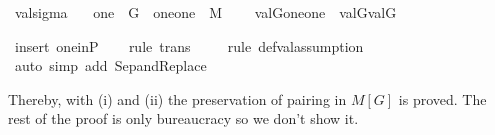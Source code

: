 \begin{isabelle}
\isamarkupfalse%
\ valsigma\ {\isacharcolon}\isanewline
\ \ {\isachardoublequoteopen}one\ {\isasymin}\ G\ {\isasymLongrightarrow}\ {\isacharbraceleft}{\isasymlangle}{\isasymtau}{\isacharcomma}one{\isasymrangle}{\isacharcomma}{\isasymlangle}{\isasymrho}{\isacharcomma}one{\isasymrangle}{\isacharbraceright}\ {\isasymin}\ M\ {\isasymLongrightarrow}\isanewline
\ \ \ val{\isacharparenleft}G{\isacharcomma}{\isacharbraceleft}{\isasymlangle}{\isasymtau}{\isacharcomma}one{\isasymrangle}{\isacharcomma}{\isasymlangle}{\isasymrho}{\isacharcomma}one{\isasymrangle}{\isacharbraceright}{\isacharparenright}\ {\isacharequal}\ {\isacharbraceleft}val{\isacharparenleft}G{\isacharcomma}{\isasymtau}{\isacharparenright}{\isacharcomma}val{\isacharparenleft}G{\isacharcomma}{\isasymrho}{\isacharparenright}{\isacharbraceright}{\isachardoublequoteclose}

\isamarkupfalse%
\ {\isacharparenleft}insert\ one{\isacharunderscore}in{\isacharunderscore}P{\isacharparenright}\isanewline
\ \ \isamarkupfalse%
\ {\isacharparenleft}rule\ trans{\isacharparenright}\isanewline
\ \ \ \isamarkupfalse%
\ {\isacharparenleft}rule\ def{\isacharunderscore}val{\isacharcomma}assumption{\isacharparenright}\isanewline
\ \ \isamarkupfalse%
\ {\isacharparenleft}auto\ simp\ add{\isacharcolon}\ Sep{\isacharunderscore}and{\isacharunderscore}Replace{\isacharparenright}\isanewline
{}\isamarkupfalse%
\end{isabelle}

Thereby, with (i) and (ii) the preservation of pairing in $M[G]$ is proved. The rest
of the proof is only bureaucracy so we don't show it.


